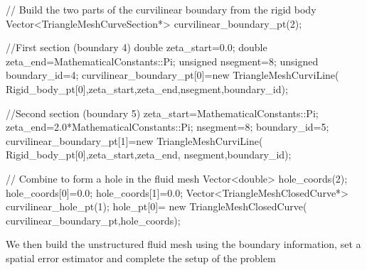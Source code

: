 \begin{DoxyCodeInclude}

 \textcolor{comment}{// Build the two parts of the curvilinear boundary from the rigid body}
 Vector<TriangleMeshCurveSection*> curvilinear\_boundary\_pt(2);

 \textcolor{comment}{//First section (boundary 4)}
 \textcolor{keywordtype}{double} zeta\_start=0.0;
 \textcolor{keywordtype}{double} zeta\_end=MathematicalConstants::Pi;
 \textcolor{keywordtype}{unsigned} nsegment=8; 
 \textcolor{keywordtype}{unsigned} boundary\_id=4; 
 curvilinear\_boundary\_pt[0]=\textcolor{keyword}{new} TriangleMeshCurviLine(
  Rigid\_body\_pt[0],zeta\_start,zeta\_end,nsegment,boundary\_id);

 \textcolor{comment}{//Second section (boundary 5)}
 zeta\_start=MathematicalConstants::Pi;
 zeta\_end=2.0*MathematicalConstants::Pi;
 nsegment=8; 
 boundary\_id=5; 
 curvilinear\_boundary\_pt[1]=\textcolor{keyword}{new} TriangleMeshCurviLine(
  Rigid\_body\_pt[0],zeta\_start,zeta\_end, 
  nsegment,boundary\_id);
  
 \textcolor{comment}{// Combine to form a hole in the fluid mesh}
 Vector<double> hole\_coords(2);
 hole\_coords[0]=0.0;
 hole\_coords[1]=0.0;
 Vector<TriangleMeshClosedCurve*> curvilinear\_hole\_pt(1);
 hole\_pt[0]=
  \textcolor{keyword}{new} TriangleMeshClosedCurve(
   curvilinear\_boundary\_pt,hole\_coords);

\end{DoxyCodeInclude}


We then build the unstructured fluid mesh using the boundary information, set a spatial error estimator and complete the setup of the problem


